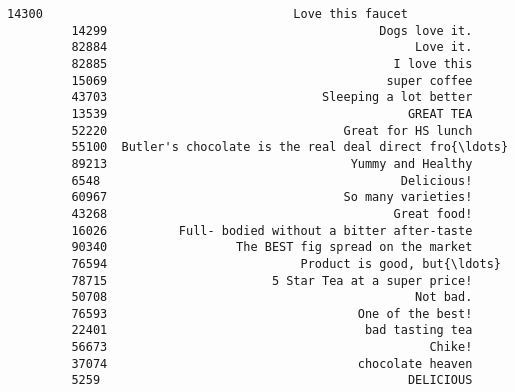\documentclass[11pt]{article}
\begin{document}
\begin{Verbatim}[commandchars=\\\{\}]
         14300                                   Love this faucet   
         14299                                      Dogs love it.   
         82884                                           Love it.   
         82885                                        I love this   
         15069                                       super coffee   
         43703                              Sleeping a lot better   
         13539                                          GREAT TEA   
         52220                                 Great for HS lunch   
         55100  Butler's chocolate is the real deal direct fro{\ldots}   
         89213                                  Yummy and Healthy   
         6548                                          Delicious!   
         60967                                 So many varieties!   
         43268                                        Great food!   
         16026          Full- bodied without a bitter after-taste   
         90340                  The BEST fig spread on the market   
         76594                           Product is good, but{\ldots}   
         78715                       5 Star Tea at a super price!   
         50708                                           Not bad.   
         76593                                   One of the best!   
         22401                                    bad tasting tea   
         56673                                             Chike!   
         37074                                   chocolate heaven   
         5259                                           DELICIOUS   
         

\end{Verbatim}
\end{document}
